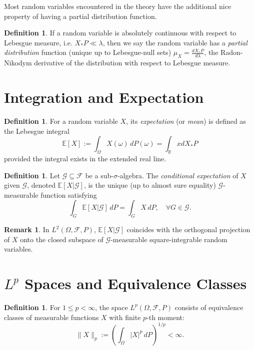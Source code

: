 \documentclass[11pt]{amsart}
\theoremstyle{definition}
\newtheorem{definition}[theorem]{Definition}
\newtheorem{remark}[theorem]{Remark}
\theoremstyle{remark}
\begin{document}
Most random variables encountered in the theory have the additional nice property of having a partial distribution function.

\begin{definition}
If a random variable is absolutely continuous with respect to Lebesgue measure, i.e. \(X_{*}P \ll \lambda\), then we say the random variable has a \emph{partial distribution} function (unique up to Lebesgue-null sets) \(\mu_{X} = \frac{d X_{*}P}{d\lambda}\), the Radon-Nikodym derivative of the distribution with respect to Lebesgue measure.
\end{definition}

\section{Integration and Expectation}

\begin{definition}
For a random variable $X$, its \emph{expectation} (or \emph{mean}) is defined as the Lebesgue integral
\[
\mathbb{E}[X] 
:= \int_\Omega X(\omega) \, dP(\omega)
= \int_{\mathbb{R}} x dX_*P
\]
provided the integral exists in the extended real line.
\end{definition}

\begin{definition}
Let $\mathcal{G} \subseteq \mathcal{F}$ be a sub-$\sigma$-algebra. The \emph{conditional expectation} of $X$ given $\mathcal{G}$, denoted $\mathbb{E}[X|\mathcal{G}]$, is the unique (up to almost sure equality) $\mathcal{G}$-measurable function satisfying
\[
\int_G \mathbb{E}[X|\mathcal{G}] \, dP = \int_G X \, dP, \quad \forall G \in \mathcal{G}.
\]
\end{definition}

\begin{remark}
In $L^2(\Omega, \mathcal{F}, P)$, $\mathbb{E}[X|\mathcal{G}]$ coincides with the orthogonal projection of $X$ onto the closed subspace of $\mathcal{G}$-measurable square-integrable random variables.
\end{remark}

\section{\texorpdfstring{$L^p$}{Lp} Spaces and Equivalence Classes}

\begin{definition}
For $1 \leq p < \infty$, the space $L^p(\Omega, \mathcal{F}, P)$ consists of equivalence classes of measurable functions $X$ with finite $p$-th moment:
\[
\|X\|_p := \left( \int_\Omega |X|^p \, dP \right)^{1/p} < \infty.
\]
\end{definition}
\end{document}
